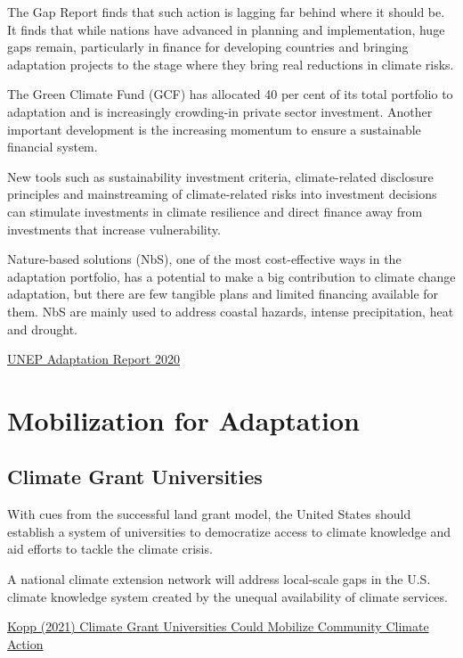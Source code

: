 \documentclass[
]{book}
\begin{document}
The Gap Report finds that such action is lagging far behind where it should be.
It finds that while nations have advanced in planning and implementation, huge gaps remain,
particularly in finance for developing countries and
bringing adaptation projects to the stage where they bring real reductions in climate risks.

The Green Climate Fund (GCF) has allocated 40 per
cent of its total portfolio to adaptation and is increasingly crowding-in private sector investment.
Another important development is the increasing momentum to ensure a sustainable financial
system.

New tools such as sustainability investment criteria, climate-related disclosure principles
and mainstreaming of climate-related risks into investment decisions can stimulate investments in
climate resilience and direct finance away from investments that increase vulnerability.

Nature-based solutions (NbS), one of the most cost-effective ways in the adaptation portfolio, has
a potential to make a big contribution to climate change adaptation, but there are few tangible
plans and limited financing available for them.
NbS are mainly used to address coastal hazards, intense precipitation, heat and
drought.

\href{https://www.unep.org/resources/adaptation-gap-report-2020}{UNEP Adaptation Report 2020}

\hypertarget{mobilization-for-adaptation}{%
\section{Mobilization for Adaptation}\label{mobilization-for-adaptation}}

\hypertarget{climate-grant-universities}{%
\subsection{Climate Grant Universities}\label{climate-grant-universities}}

With cues from the successful land grant model, the United States should establish a system of universities to democratize access to climate knowledge and aid efforts to tackle the climate crisis.

A national climate extension network will address local-scale gaps in the U.S. climate knowledge system created by the unequal availability of climate services.

\href{https://eos.org/opinions/climate-grant-universities-could-mobilize-community-climate-action}{Kopp (2021) Climate Grant Universities Could Mobilize Community Climate Action}
\end{document}
